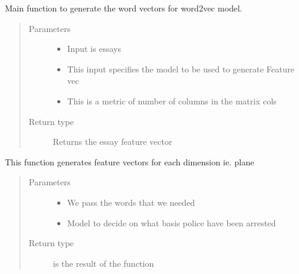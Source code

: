 \documentclass[letterpaper,10pt,english]{sphinxmanual}
\begin{document}
\begin{fulllineitems}
\label{\detokenize{prediction:prediction.getAvgFeatureVecs}}
Main function to generate the word vectors for word2vec model.
\begin{quote}\begin{description}
\item[{Parameters}] \leavevmode\begin{itemize}
\item {} 
 \textendash{} Input is essays

\item {} 
 \textendash{} This input specifies the model to be used to generate Feature vec

\item {} 
 \textendash{} This is a metric of number of columns in the matrix cols

\end{itemize}

\item[{Return type}] \leavevmode
Returns the essay feature vector

\end{description}\end{quote}

\end{fulllineitems}


\begin{fulllineitems}
\label{\detokenize{prediction:prediction.makeFeatureVec}}
This function generates feature vectors for each dimension ie. plane
\begin{quote}\begin{description}
\item[{Parameters}] \leavevmode\begin{itemize}
\item {} 
 \textendash{} We pass the words that we needed

\item {} 
 \textendash{} Model to decide on what basis police have been arrested

\end{itemize}

\item[{Return type}] \leavevmode
{} is the result of the function

\end{description}\end{quote}

\end{fulllineitems}
\end{document}
